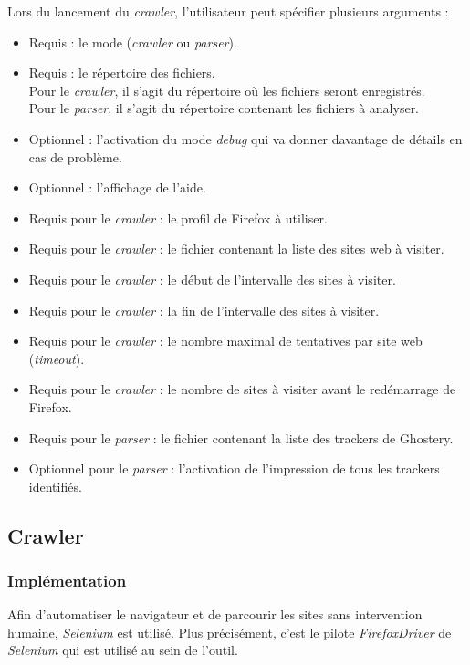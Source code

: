 Lors du lancement du \textit{crawler}, l'utilisateur peut spécifier plusieurs arguments :
\begin{itemize}
	\item Requis : le mode (\textit{crawler} ou \textit{parser}).
	\item Requis : le répertoire des fichiers.\\
		Pour le \textit{crawler}, il s'agit du répertoire où les fichiers seront enregistrés.\\
		Pour le \textit{parser}, il s'agit du répertoire contenant les fichiers à analyser.
	\item Optionnel : l'activation du mode \textit{debug} qui va donner davantage de détails en cas de problème.
	\item Optionnel : l'affichage de l'aide.
	\newline
	\item Requis pour le \textit{crawler} : le profil de Firefox à utiliser.
	\item Requis pour le \textit{crawler} : le fichier contenant la liste des sites web à visiter.
	\item Requis pour le \textit{crawler} : le début de l'intervalle des sites à visiter.
	\item Requis pour le \textit{crawler} : la fin de l'intervalle des sites à visiter.
	\item Requis pour le \textit{crawler} : le nombre maximal de tentatives par site web (\textit{timeout}).
	\item Requis pour le \textit{crawler} : le nombre de sites à visiter avant le redémarrage de Firefox.
	\newline
	\item Requis pour le \textit{parser} : le fichier contenant la liste des trackers de Ghostery.
	\item Optionnel pour le \textit{parser} : l'activation de l'impression de tous les trackers identifiés.
\end{itemize}

\subsection{Crawler}
\label{crawler}
\subsubsection{Implémentation}
Afin d'automatiser le navigateur et de parcourir les sites sans intervention humaine, \textit{Selenium} \cite{selenium_homepage} est utilisé. Plus précisément, c'est le pilote \textit{FirefoxDriver} de \textit{Selenium} qui est utilisé au sein de l'outil.

